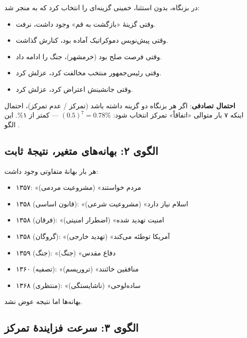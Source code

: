 \begin{warningBox}
در  بزنگاه، بدون استثنا، خمینی گزینه‌ای را انتخاب کرد که به  منجر شد:

\begin{itemize}[label=\textcolor{cAccent}{$\blacktriangleright$}, rightmargin=2em]
    \item وقتی گزینهٔ «بازگشت به قم» وجود داشت، نرفت.
    \item وقتی پیش‌نویس دموکراتیک آماده بود، کنارش گذاشت.
    \item وقتی فرصت صلح بود (خرمشهر)، جنگ را ادامه داد.
    \item وقتی رئیس‌جمهور منتخب مخالفت کرد، عزلش کرد.
    \item وقتی جانشینش اعتراض کرد، عزلش کرد.
\end{itemize}

\textbf{احتمال تصادفی}: اگر هر بزنگاه دو گزینه داشته باشد (تمرکز / عدم تمرکز)، احتمال اینکه ۷ بار متوالی «اتفاقاً» تمرکز انتخاب شود: $(0.5)^7 = 0.78\%$ — کمتر از ۱\%. این الگو .
\end{warningBox}

\subsection{الگوی ۲: بهانه‌های متغیر، نتیجهٔ ثابت}

\begin{noteBox}
هر بار بهانهٔ متفاوتی وجود داشت:
\begin{itemize}[label=\textcolor{cGold}{$\bullet$}, rightmargin=2em]
    \item ۱۳۵۷: «مردم خواستند» (مشروعیت مردمی)
    \item ۱۳۵۸ (قانون اساسی): «اسلام نیاز دارد» (مشروعیت شرعی)
    \item ۱۳۵۸ (فرقان): «امنیت تهدید شده» (اضطرار امنیتی)
    \item ۱۳۵۸ (گروگان): «آمریکا توطئه می‌کند» (تهدید خارجی)
    \item ۱۳۵۹ (جنگ): «دفاع مقدس» (جنگ)
    \item ۱۳۶۰ (تصفیه): «منافقین خائنند» (تروریسم)
    \item ۱۳۶۸ (منتظری): «ساده‌لوحی» (ناشایستگی)
\end{itemize}

بهانه‌ها  اما نتیجه  عوض نشد.
\end{noteBox}

\subsection{الگوی ۳: سرعت فزایندهٔ تمرکز}

